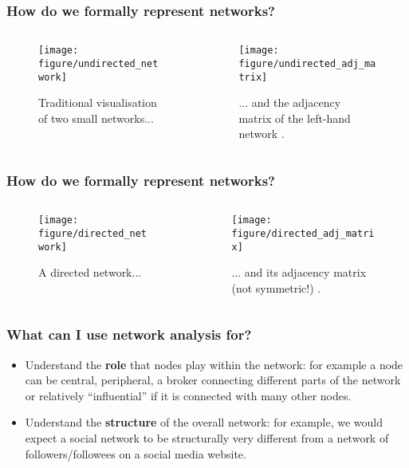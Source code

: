 \documentclass[serif, aspectratio=169]{beamer}
\begin{document}
\begin{frame}
\frametitle{How do we formally represent networks?}

\begin{columns}
\begin{column}{0.6\textwidth}
\begin{figure}
    \centering
    \texttt{[image: figure/undirected\_network]}
\caption{Traditional visualisation of two small networks...}
\end{figure}
\end{column}
\begin{column}{0.4\textwidth}
\begin{figure}
    \centering
    \texttt{[image: figure/undirected\_adj\_matrix]}
\caption{... and the adjacency matrix of the left-hand network \autocite[111]{newman_networks_2010}.}
\end{figure}
\end{column}
\end{columns}
\end{frame}

\begin{frame}
\frametitle{How do we formally represent networks?}

\begin{columns}
\begin{column}{0.5\textwidth}
\begin{figure}
    \centering
    \texttt{[image: figure/directed\_network]}
\caption{A directed network...}
\end{figure}
\end{column}
\begin{column}{0.5\textwidth}
\begin{figure}
    \centering
    \texttt{[image: figure/directed\_adj\_matrix]}
\caption{... and its adjacency matrix (not symmetric!) \autocite[112]{newman_networks_2010}.}
\end{figure}
\end{column}
\end{columns}
\end{frame}

\begin{frame}
\frametitle{What can I use network analysis for?}

\begin{itemize}

\item Understand the \textbf{role} that nodes play within the network: for example a node can be central, peripheral, a broker connecting different parts of the network or relatively ``influential'' if it is connected with many other nodes. 

\item Understand the \textbf{structure} of the overall network: for example, we would expect a social network to be structurally very different from a network of followers/followees on a social media website.

\end{itemize}

\end{frame}
\end{document}
